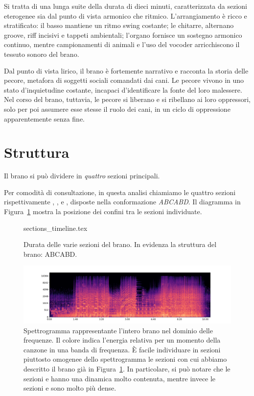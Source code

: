 \documentclass[class=book, crop=false, oneside, 12pt]{standalone}
\begin{document}
    Si tratta di una lunga suite della durata di dieci minuti, caratterizzata da sezioni eterogenee sia dal punto di vista armonico che ritmico. L'arrangiamento è ricco e stratificato: il basso 
    mantiene un ritmo swing costante; le chitarre, alternano groove, riff incisivi e tappeti ambientali; l'organo fornisce un sostegno armonico continuo, mentre campionamenti di animali e l'uso del vocoder arricchiscono il tessuto sonoro del brano.

    Dal punto di vista lirico, il brano è fortemente narrativo e racconta la storia delle pecore, metafora di soggetti sociali comandati dai cani. Le pecore vivono in uno stato d'inquietudine costante, incapaci d'identificare la fonte del loro malessere. Nel corso del brano, tuttavia, le pecore si liberano e si ribellano ai loro oppressori, solo per poi assumere esse stesse il ruolo dei cani, in un ciclo di oppressione apparentemente senza fine.

    \section{Struttura}
    \label{sec:04-struttura}

    Il brano si può dividere in \emph{quattro} sezioni principali.

    Per comodità di consultazione, in questa analisi chiamiamo le quattro sezioni rispettivamente , ,  e , disposte nella conformazione \emph{ABCABD}. Il diagramma in Figura~\ref{fig:04-sections-timeline} mostra la posizione dei confini tra le sezioni individuate.

    \begin{figure}[htb]
        \centering
        {sections_timeline.tex}
        \caption[Durata delle varie sezioni del brano.]{Durata delle varie sezioni del brano. In evidenza la struttura del brano: ABCABD.}
        \label{fig:04-sections-timeline}
    \end{figure}

    \begin{figure}[htb]
        \centering
        \includegraphics[width=\textwidth]{sheep_spectrogram.png}
        \caption[Spettrogramma rappresentante l'intero brano nel dominio delle frequenze.]{Spettrogramma rappresentante l'intero brano nel dominio delle frequenze. Il colore indica l'energia relativa per un momento della canzone in una banda di frequenza. È facile individuare in sezioni piuttosto omogenee dello spettrogramma le sezioni con cui abbiamo descritto il brano già in Figura~\ref{fig:04-sections-timeline}. In particolare, si può notare che  le sezioni  e  hanno una dinamica molto contenuta, mentre invece le sezioni  e  sono molto più dense.}
        \label{fig:sheep-spectrogram}
    \end{figure}
\end{document}

